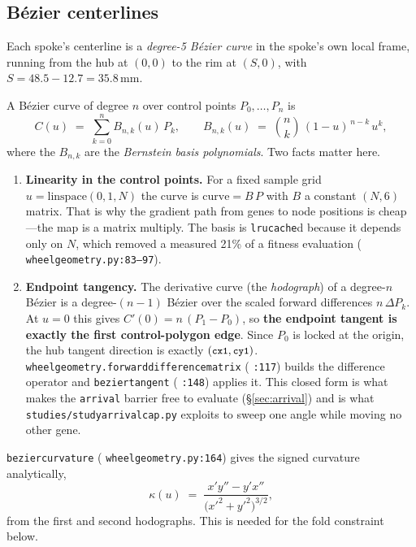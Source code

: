 \documentclass[11pt,a4paper]{article}
\DeclareRobustCommand{\code}[1]{%
  \texttt{\small\def\_{\textunderscore\discretionary{}{}{}}#1}}
\newcommand{\at}[2]{\code{#1:#2}}
\begin{document}
\subsection{B\'ezier centerlines}
\label{sec:bezier}

Each spoke's centerline is a \emph{degree-5 B\'ezier curve} in the spoke's own local
frame, running from the hub at $(0,0)$ to the rim at $(S,0)$, with
$S = 48.5 - 12.7 = 35.8$\,mm.

A B\'ezier curve of degree $n$ over control points $P_0,\dots,P_n$ is
%
\begin{equation}
  C(u) \;=\; \sum_{k=0}^{n} B_{n,k}(u)\,P_k,
  \qquad
  B_{n,k}(u) \;=\; \binom{n}{k}\,(1-u)^{\,n-k}\,u^{k},
\end{equation}
%
where the $B_{n,k}$ are the \emph{Bernstein basis polynomials}. Two facts matter here.

\begin{enumerate}
\item \textbf{Linearity in the control points.} For a fixed sample grid
  $u = \mathrm{linspace}(0,1,N)$ the curve is $\mathrm{curve} = B\,P$ with $B$ a
  constant $(N,6)$ matrix. That is why the gradient path from genes to node positions
  is cheap---the map is a matrix multiply. The basis is \code{lru\_cache}d because it
  depends only on $N$, which removed a measured 21\% of a fitness evaluation
  (\at{wheel\_geometry.py}{83--97}).

\item \textbf{Endpoint tangency.} The derivative curve (the \emph{hodograph}) of a
  degree-$n$ B\'ezier is a degree-$(n-1)$ B\'ezier over the scaled forward differences
  $n\,\Delta P_k$. At $u = 0$ this gives $C'(0) = n\,(P_1 - P_0)$, so \textbf{the
  endpoint tangent is exactly the first control-polygon edge}. Since $P_0$ is locked at
  the origin, the hub tangent direction is exactly $(\code{cx1}, \code{cy1})$.
  \code{wheel\_geometry.forward\_difference\_matrix} (\code{:117}) builds the difference
  operator and \code{bezier\_tangent} (\code{:148}) applies it. This closed form is what
  makes the \code{arrival} barrier free to evaluate (\S\ref{sec:arrival}) and is what
  \code{studies/study\_arrival\_cap.py} exploits to sweep one angle while moving no
  other gene.
\end{enumerate}

\code{bezier\_curvature} (\at{wheel\_geometry.py}{164}) gives the signed curvature
analytically,
%
\begin{equation}
  \kappa(u) \;=\; \frac{x'y'' - y'x''}{\bigl(x'^2 + y'^2\bigr)^{3/2}},
  \label{eq:curvature}
\end{equation}
%
from the first and second hodographs. This is needed for the fold constraint below.
\end{document}
